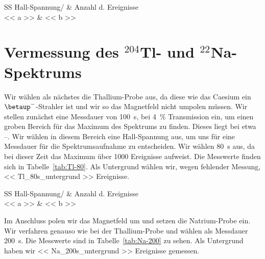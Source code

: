 \begin{table}[htbp]
    \centering
    \begin{tabular}{SS}
        {Hall-Spannung/\si{\skt}} & {Anzahl d. Ereignisse} \\
        \midrule
        << a >> & << b >> \\
    \end{tabular}
    \caption{%
        Messwerte zur Kalibrierung des Spektrometers. Probe: ${}^{137}$Cs,
        Zeit: \SI{100}{\second}, Transmission: \SI{1}{\percent}.
    }
    \label{tab:Cs-100}
\end{table}

\section{Vermessung des ${}^{204}$Tl- und ${}^{22}$Na-Spektrums}

Wir wählen als nächstes die Thallium-Probe aus, da diese wie das Caesium ein
$\betaup^-$-Strahler ist und wir so das Magnetfeld nicht umpolen müssen. Wir
stellen zunächst eine Messdauer von \SI{100}{\second}, bei \SI{4}{\percent}
Transmission ein, um einen groben Bereich für das Maximum des Spektrums zu
finden. Dieses liegt bei etwa \SIrange{}{}{\skt}. Wir wählen in diesem Bereich
eine Hall-Spannung aus, um uns für eine Messdauer für die Spektrumsaufnahme
zu entscheiden. Wir wählen \SI{80}{\second} aus, da bei dieser Zeit das Maximum
über \num{1000} Ereignisse aufweist. Die Messwerte finden sich in
Tabelle~\ref{tab:Tl-80}. Als Untergrund wählen wir, wegen fehlender Messung,
\num{<< Tl_80s_untergrund >>} Ereignisse.

\begin{table}[htbp]
    \centering
    \begin{tabular}{SS}
        {Hall-Spannung/\si{\skt}} & {Anzahl d. Ereignisse} \\
        \midrule
        << a >> & << b >> \\
    \end{tabular}
    \caption{%
        Messwerte zur Bestimmung des $\betaup$-Spektrums. Probe: ${}^{204}$Tl,
        Zeit: \SI{80}{\second}, Transmission: \SI{4}{\percent}.
    }
    \label{tab:Tl-80}
\end{table}

Im Anschluss polen wir das Magnetfeld um und setzen die Natrium-Probe ein. Wir
verfahren genauso wie bei der Thallium-Probe und wählen als Messdauer
\SI{200}{\second}. Die Messwerte sind in Tabelle~\ref{tab:Na-200} zu sehen. Als
Untergrund haben wir \num{<< Na_200s_untergrund >>} Ereignisse gemessen.

